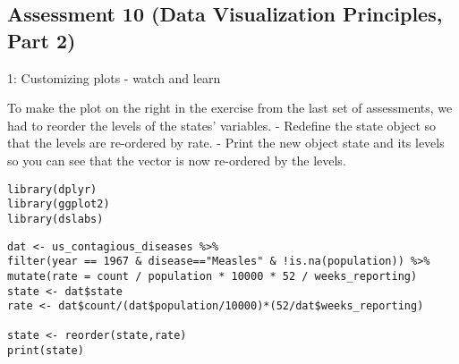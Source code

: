 \documentclass[]{article}
\begin{document}
\hypertarget{assessment-10-data-visualization-principles-part-2}{%
\subsection{Assessment 10 (Data Visualization Principles, Part
2)}\label{assessment-10-data-visualization-principles-part-2}}

1: Customizing plots - watch and learn

To make the plot on the right in the exercise from the last set of
assessments, we had to reorder the levels of the states' variables. -
Redefine the state object so that the levels are re-ordered by rate. -
Print the new object state and its levels so you can see that the vector
is now re-ordered by the levels.

\begin{verbatim}
library(dplyr)
library(ggplot2)
library(dslabs)
\end{verbatim}

\begin{verbatim}
dat <- us_contagious_diseases %>%
filter(year == 1967 & disease=="Measles" & !is.na(population)) %>% mutate(rate = count / population * 10000 * 52 / weeks_reporting)
state <- dat$state 
rate <- dat$count/(dat$population/10000)*(52/dat$weeks_reporting)

state <- reorder(state,rate)
print(state)
\end{verbatim}
\end{document}
